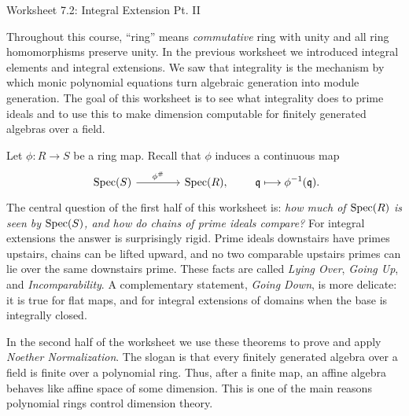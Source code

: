 \documentclass[Notebook.tex]{subfiles}
\begin{document}
\ifSubfilesClassLoaded{}{}

\begin{center}
    {Worksheet 7.2: Integral Extension Pt. II}
\end{center}

Throughout this course, ``ring'' means \textit{commutative} ring with unity and all ring homomorphisms preserve unity. In the previous worksheet we introduced integral elements and integral extensions. We saw that integrality is the mechanism by which monic polynomial equations turn algebraic generation into module generation. The goal of this worksheet is to see what integrality does to prime ideals and to use this to make dimension computable for finitely generated algebras over a field.

Let $\phi:R\to S$ be a ring map. Recall that $\phi$ induces a continuous map
\[
\begin{tikzcd}[row sep=.3em, column sep=4em]
\Spec(S) \arrow[r, "\phi^{\#}"] & \Spec(R),
\end{tikzcd}
\qquad
\fq\longmapsto \phi^{-1}(\fq).
\]
The central question of the first half of this worksheet is: \emph{how much of $\operatorname{Spec}(R)$ is seen by $\operatorname{Spec}(S)$, and how do chains of prime ideals compare?} For integral extensions the answer is surprisingly rigid. Prime ideals downstairs have primes upstairs, chains can be lifted upward, and no two comparable upstairs primes can lie over the same downstairs prime. These facts are called \emph{Lying Over}, \emph{Going Up}, and \emph{Incomparability}. A complementary statement, \emph{Going Down}, is more delicate: it is true for flat maps, and for integral extensions of domains when the base is integrally closed.

In the second half of the worksheet we use these theorems to prove and apply \emph{Noether Normalization}. The slogan is that every finitely generated algebra over a field is finite over a polynomial ring. Thus, after a finite map, an affine algebra behaves like affine space of some dimension. This is one of the main reasons polynomial rings control dimension theory.

\hrulefill


\newpage 
\end{document}
